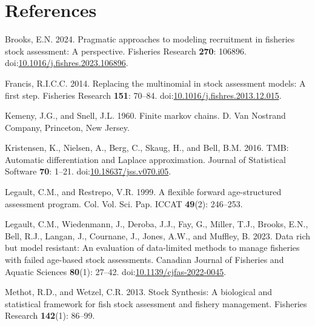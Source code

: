 \documentclass[
]{article}
\newlength{\cslhangindent}
\newlength{\cslentryspacingunit} %
\newenvironment{CSLReferences}[2] %
 {%
  \setlength{\parindent}{0pt}
  \ifodd #1
  \let\oldpar\par
  \def\par{\hangindent=\cslhangindent\oldpar}
  \fi
  \setlength{\parskip}{#2\cslentryspacingunit}
 }%
 {}
\begin{document}
\hypertarget{references}{%
\section*{References}\label{references}}

\hypertarget{refs}{}
\begin{CSLReferences}{1}{0}
\leavevmode{}%
Brooks, E.N. 2024. Pragmatic approaches to modeling recruitment in
fisheries stock assessment: A perspective. Fisheries Research
\textbf{270}: 106896.
doi:\href{https://doi.org/10.1016/j.fishres.2023.106896}{10.1016/j.fishres.2023.106896}.

\leavevmode{}%
Francis, R.I.C.C. 2014. Replacing the multinomial in stock assessment
models: A first step. Fisheries Research \textbf{151}: 70--84.
doi:\href{https://doi.org/10.1016/j.fishres.2013.12.015}{10.1016/j.fishres.2013.12.015}.

\leavevmode{}%
Kemeny, J.G., and Snell, J.L. 1960. Finite markov chains. D. Van
Nostrand Company, Princeton, New Jersey.

\leavevmode{}%
Kristensen, K., Nielsen, A., Berg, C., Skaug, H., and Bell, B.M. 2016.
{TMB}: Automatic differentiation and {Laplace} approximation. Journal of
Statistical Software \textbf{70}: 1--21.
doi:\href{https://doi.org/10.18637/jss.v070.i05}{10.18637/jss.v070.i05}.

\leavevmode{}%
Legault, C.M., and Restrepo, V.R. 1999. A flexible forward
age-structured assessment program. Col. Vol. Sci. Pap. ICCAT
\textbf{49}(2): 246--253.

\leavevmode{}%
Legault, C.M., Wiedenmann, J., Deroba, J.J., Fay, G., Miller, T.J.,
Brooks, E.N., Bell, R.J., Langan, J., Cournane, J., Jones, A.W., and
Muffley, B. 2023. Data rich but model resistant: An evaluation of
data-limited methods to manage fisheries with failed age-based stock
assessments. Canadian Journal of Fisheries and Aquatic Sciences
\textbf{80}(1): 27--42.
doi:\href{https://doi.org/10.1139/cjfas-2022-0045}{10.1139/cjfas-2022-0045}.

\leavevmode{}%
Methot, R.D., and Wetzel, C.R. 2013. Stock {S}ynthesis: A biological and
statistical framework for fish stock assessment and fishery management.
Fisheries Research \textbf{142}(1): 86--99.


\end{CSLReferences}
\end{document}
